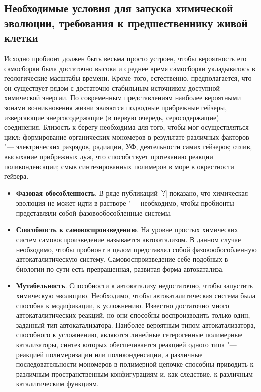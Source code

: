 \documentclass[12pt,a4paper,oneside]{book}
\begin{document}
\subsection{Необходимые условия для запуска химической эволюции, требования к предшественнику живой клетки}

Исходно пробионт должен быть весьма просто устроен, чтобы вероятность его самосборки была достаточно высока и среднее время самосборки укладывалось в геологические масштабы времени. Кроме того, естественно, предполагается, что он существует рядом с достаточно стабильным источником доступной химической энергии. По современным представлениям наиболее вероятными зонами возникновения жизни являются подводные прибрежные гейзеры, извергающие энергосодержащие (в первую очередь, серосодержащие) соединения. Близость к берегу необходима для того, чтобы мог осуществляться цикл: формирование органических мономеров в результате различных факторов "--- электрических разрядов,  радиации, УФ, деятельности самих гейзеров; отлив, высыхание прибрежных луж, что способствует протеканию реакции поликонденсации; смыв синтезированных полимеров в море в окрестности гейзера. 

\begin{itemize}
\item {\bf Фазовая обособленность}. В ряде публикаций [?] показано, что химическая эволюция не может идти в растворе "--- необходимо, чтобы пробионты представляли собой фазовообособленные системы. 

\item {\bf Способность к самовоспроизведению}. На уровне простых химических систем самовоспроизведение называется автокатализом. В данном случае необходимо, чтобы пробионт в целом представлял собой фазовообособленную автокаталитическую систему. Самовоспроизведение себе подобных в биологии по сути есть превращенная, развитая форма автокатализа.

\item {\bf Мутабельность}. Способности к автокатализу недостаточно, чтобы запустить химическую эволюцию. Необходимо, чтобы автокаталитическая система была способна к модификации, к усложнению. Известно достаточно много автокаталитических реакций, но они способны воспроизводить только один, заданный тип автокатализатора. Наиболее вероятным типом автокатализатора, способного к усложнению, являются линейные гетерогенные полимерные катализаторы, синтез которых обеспечивается реакцией одного типа "--- реакцией полимеризации или поликонденсации, а различные последовательности мономеров в полимерной цепочке способны приводить к различным пространственным конфигурациям и, как следствие, к различным каталитическим функциям. 
\end{itemize}
\end{document}

